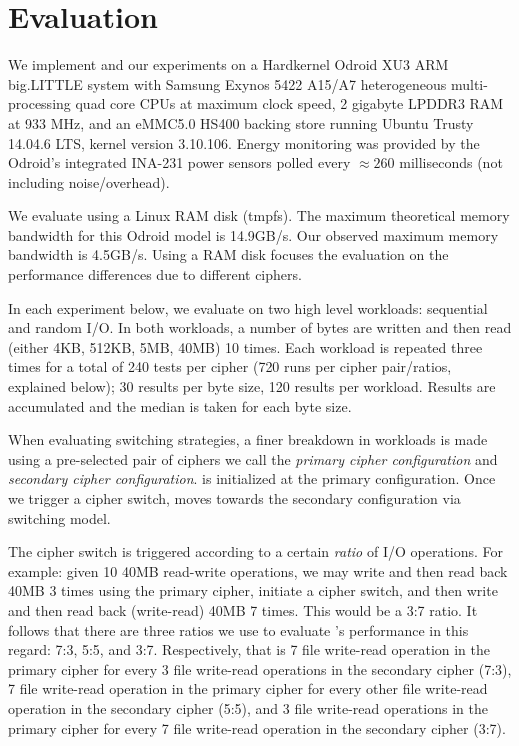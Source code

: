 \section{Evaluation}\label{sec:eval}

We implement \sys and our experiments on a Hardkernel Odroid XU3 ARM big.LITTLE
system with Samsung Exynos 5422 A15/A7 heterogeneous multi-processing quad core
CPUs at maximum clock speed, 2 gigabyte LPDDR3 RAM at 933 MHz, and an eMMC5.0
HS400 backing store running Ubuntu Trusty 14.04.6 LTS, kernel version 3.10.106.
Energy monitoring was provided by the Odroid's integrated INA-231 power sensors
polled every $\approx{260}$ milliseconds (not including noise/overhead).

We evaluate \sys using a Linux RAM disk (tmpfs). The maximum theoretical memory
bandwidth for this Odroid model is 14.9GB/s\@. Our observed maximum memory
bandwidth is 4.5GB/s. Using a RAM disk focuses the evaluation on the performance
differences due to different ciphers.

In each experiment below, we evaluate \sys on two high level workloads:
sequential and random I/O. In both workloads, a number of bytes are written and
then read (either 4KB, 512KB, 5MB, 40MB) 10 times. Each workload is repeated
three times for a total of 240 tests per cipher (720 runs per cipher
pair/ratios, explained below); 30 results per byte size, 120 results per
workload. Results are accumulated and the median is taken for each byte size.

When evaluating switching strategies, a finer breakdown in workloads is made
using a pre-selected pair of ciphers we call the \emph{primary cipher
configuration} and \emph{secondary cipher configuration}. \sys is initialized at
the primary configuration. Once we trigger a cipher switch, \sys moves towards
the secondary configuration via switching model.

The cipher switch is triggered according to a certain \emph{ratio} of I/O
operations. For example: given 10 40MB read-write operations, we may write and
then read back 40MB 3 times using the primary cipher, initiate a cipher switch,
and then write and then read back (write-read) 40MB 7 times. This would be a 3:7
ratio. It follows that there are three ratios we use to evaluate \sys's
performance in this regard: 7:3, 5:5, and 3:7. Respectively, that is 7 file
write-read operation in the primary cipher for every 3 file write-read
operations in the secondary cipher (7:3), 7 file write-read operation in the
primary cipher for every other file write-read operation in the secondary cipher
(5:5), and 3 file write-read operations in the primary cipher for every 7 file
write-read operation in the secondary cipher (3:7).

